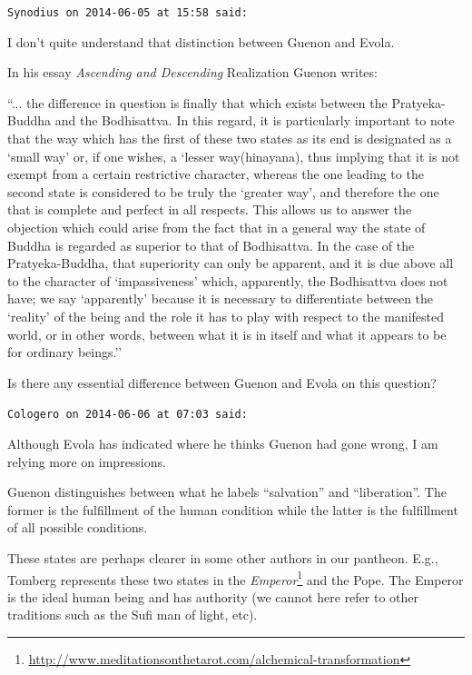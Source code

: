 \begin{footnotesize}
\begin{sffamily}
\texttt{Synodius on 2014-06-05 at 15:58 said:}

I don't quite understand that distinction between Guenon and Evola.

In his essay \textit{Ascending and Descending} Realization Guenon writes:

``... the difference in question is finally that which exists between the Pratyeka-Buddha and the Bodhisattva. In this regard, it is particularly important to note that the way which has the first of these two states as its end is designated as a `small way' or, if one wishes, a `lesser way\textquotesingle(hinayana), thus implying that it is not exempt from a certain restrictive character, whereas the one leading to the second state is considered to be truly the `greater way', and therefore the one that is complete and perfect in all respects. This allows us to answer the objection which could arise from the fact that in a general way the state of Buddha is regarded as superior to that of Bodhisattva. In the case of the Pratyeka-Buddha, that superiority can only be apparent, and it is due above all to the character of `impassiveness' which, apparently, the Bodhisattva does not have; we say `apparently' because it is necessary to differentiate between the `reality' of the being and the role it has to play with respect to the manifested world, or in other words, between what it is in itself and what it appears to be for ordinary beings.''

Is there any essential difference between Guenon and Evola on this question?

\hfill

\texttt{Cologero on 2014-06-06 at 07:03 said:}

Although Evola has indicated where he thinks Guenon had gone wrong, I am relying more on impressions.

Guenon distinguishes between what he labels ``salvation'' and ``liberation''. The former is the fulfillment of the human condition while the latter is the fulfillment of all possible conditions.

These states are perhaps clearer in some other authors in our pantheon. E.g., Tomberg represents these two states in the \textit{Emperor}\footnote{\url{http://www.meditationsonthetarot.com/alchemical-transformation}} and the Pope. The Emperor is the ideal human being and has authority (we cannot here refer to other traditions such as the Sufi man of light, etc).


\end{sffamily}
\end{footnotesize}
